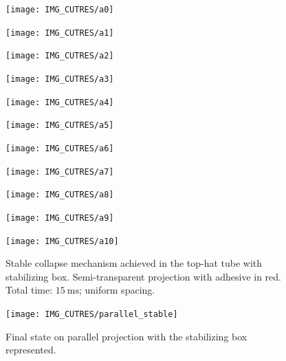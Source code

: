 \documentclass[cmfonts]{witpress}
\begin{document}
\begin{figure}
	\centering
	\begin{minipage}[b]{.06\linewidth}
		\centering
		\texttt{[image: IMG\_CUTRES/a0]}
	\end{minipage}
	\quad
	\begin{minipage}[b]{.06\linewidth}
		\centering
		\texttt{[image: IMG\_CUTRES/a1]}
	\end{minipage}
	\quad
	\begin{minipage}[b]{.06\linewidth}
		\centering
		\texttt{[image: IMG\_CUTRES/a2]}
	\end{minipage}
	\quad
	\begin{minipage}[b]{.06\linewidth}
		\centering
		\texttt{[image: IMG\_CUTRES/a3]}
	\end{minipage}
	\quad
	\begin{minipage}[b]{.06\linewidth}
		\centering
		\texttt{[image: IMG\_CUTRES/a4]}
	\end{minipage}
	\quad
	\begin{minipage}[b]{.06\linewidth}
		\centering
		\texttt{[image: IMG\_CUTRES/a5]}
	\end{minipage}
	\quad
	\begin{minipage}[b]{.06\linewidth}
		\centering
		\texttt{[image: IMG\_CUTRES/a6]}
	\end{minipage}
	\quad
	\begin{minipage}[b]{.06\linewidth}
		\centering
		\texttt{[image: IMG\_CUTRES/a7]}
	\end{minipage}
	\quad
	\begin{minipage}[b]{.06\linewidth}
		\centering
		\texttt{[image: IMG\_CUTRES/a8]}
	\end{minipage}
	\quad
	\begin{minipage}[b]{.06\linewidth}
		\centering
		\texttt{[image: IMG\_CUTRES/a9]}
	\end{minipage}
	\quad
	\begin{minipage}[b]{.06\linewidth}
		\centering
		\texttt{[image: IMG\_CUTRES/a10]}
	\end{minipage}

	\caption[Stable collapse mechanism achieved in the top-hat tube with stabilizing box.]{Stable collapse mechanism achieved in the top-hat tube with stabilizing box. Semi-transparent projection with adhesive in red. Total time: $\SI{15}{\ms}$; uniform spacing.}
	\label{fig:stable}
\end{figure}

\begin{figure}
	\centering
	\texttt{[image: IMG\_CUTRES/parallel\_stable]}
	\caption{Final state on parallel projection with the stabilizing box represented.}
	\label{fig:stabil_box}
\end{figure}
\end{document}
